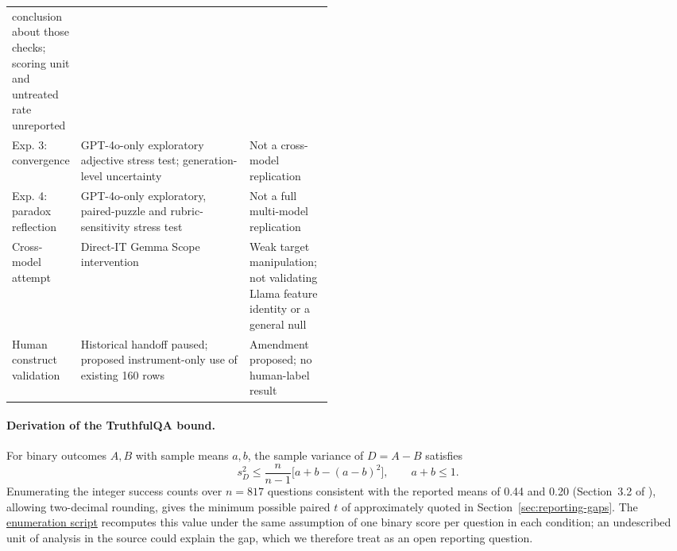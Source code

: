 \documentclass[11pt]{article}
\newcommand{\closeoutartifact}[2]{\href{https://github.com/tdj28/llm_selfref_pre/blob/294da265ee3a08b9ef42343f9461b8d4718b7bc7/#1}{#2}}
\begin{document}
\begin{table}[!t]
\begin{tabularx}{\linewidth}{@{}>{\raggedright\arraybackslash}p{0.21\linewidth}>{\raggedright\arraybackslash}X>{\raggedright\arraybackslash}p{0.26\linewidth}@{}}
conclusion about those checks; scoring unit and untreated rate unreported\\
Exp. 3: convergence & GPT-4o-only exploratory adjective stress test;
generation-level uncertainty & Not a cross-model replication\\
Exp. 4: paradox reflection & GPT-4o-only exploratory, paired-puzzle and
rubric-sensitivity stress test & Not a full multi-model replication\\
Cross-model attempt & Direct-IT Gemma Scope intervention & Weak target
manipulation; not validating Llama feature identity or a general null\\
Human construct validation & Historical handoff paused; proposed instrument-only
use of existing 160 rows & Amendment proposed; no human-label result\\
\bottomrule
\end{tabularx}
\end{table}

\paragraph{Derivation of the TruthfulQA bound.}
For binary outcomes $A,B$ with sample means $a,b$, the sample variance of
$D=A-B$ satisfies
\[
 s_D^2 \leq \frac{n}{n-1}\bigl[a+b-(a-b)^2\bigr],
 \qquad a+b\leq 1.
\]
Enumerating the integer success counts over $n=817$ questions consistent
with the reported means of 0.44 and 0.20 (Section~3.2 of
\citealp{berg2025largelanguagemodelsreport}), allowing two-decimal rounding,
gives the minimum possible paired $t$ of approximately \TruthfulQAMinPairedT{} quoted in
Section~\ref{sec:reporting-gaps}. The
\closeoutartifact{scripts/verify_reporting_bound.py}{enumeration script}
recomputes this value under the same assumption of one binary score per
question in each condition; an undescribed unit of analysis in the source
could explain the gap, which we therefore treat as an open reporting question.
\end{document}
